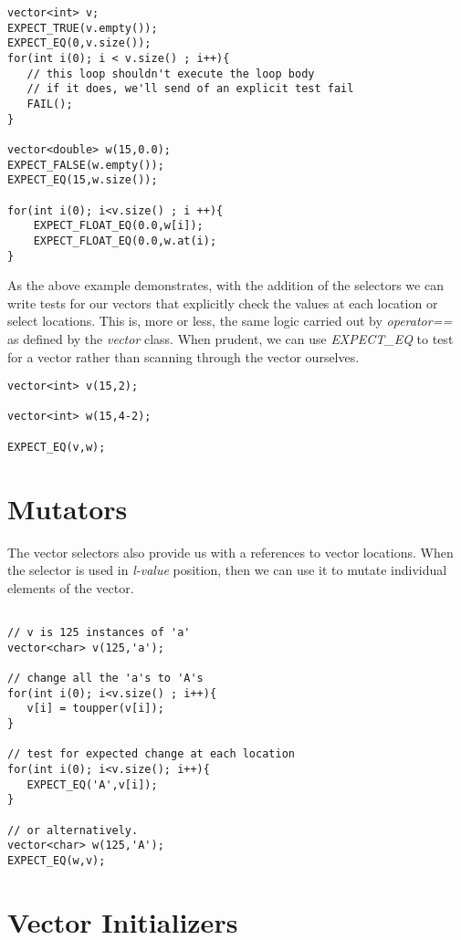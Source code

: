\documentclass[]{tufte-handout}
\begin{document}
\begin{verbatim}
vector<int> v;
EXPECT_TRUE(v.empty());
EXPECT_EQ(0,v.size());
for(int i(0); i < v.size() ; i++){
   // this loop shouldn't execute the loop body
   // if it does, we'll send of an explicit test fail
   FAIL();   
}

vector<double> w(15,0.0);
EXPECT_FALSE(w.empty());
EXPECT_EQ(15,w.size());

for(int i(0); i<v.size() ; i ++){
	EXPECT_FLOAT_EQ(0.0,w[i]);
	EXPECT_FLOAT_EQ(0.0,w.at(i);
}
\end{verbatim}

As the above example demonstrates, with the addition of the selectors we can write tests for our vectors that explicitly check the values at each location or select locations. This is, more or less, the same logic carried out by \textit{operator==} as defined by the \textit{vector} class. When prudent, we can use \textit{EXPECT\_EQ} to test for a vector rather than scanning through the vector ourselves.
\begin{verbatim}
vector<int> v(15,2);

vector<int> w(15,4-2);

EXPECT_EQ(v,w);
\end{verbatim}

\section{Mutators} 	

The vector selectors also provide us with a references to vector locations. When the selector is used in \textit{l-value} position, then we can use it to mutate individual elements of the vector.
\begin{verbatim}

// v is 125 instances of 'a'
vector<char> v(125,'a');

// change all the 'a's to 'A's
for(int i(0); i<v.size() ; i++){
   v[i] = toupper(v[i]);
}

// test for expected change at each location
for(int i(0); i<v.size(); i++){
   EXPECT_EQ('A',v[i]);
}

// or alternatively. 
vector<char> w(125,'A');
EXPECT_EQ(w,v);

\end{verbatim}

\section{Vector Initializers}
\end{document}
